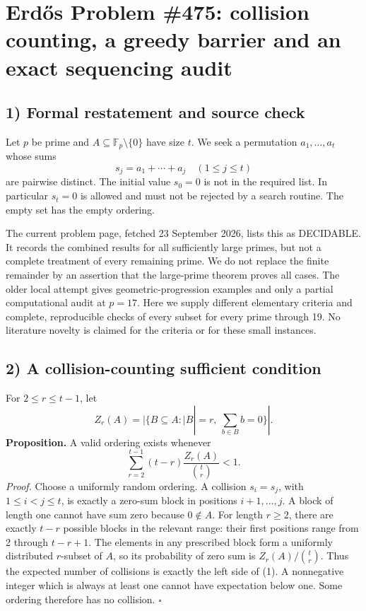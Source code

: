 \section{Erd\H{o}s Problem \#475: collision counting, a greedy barrier and an exact sequencing audit}

\subsection*{1) Formal restatement and source check}
Let $p$ be prime and $A\subseteq\mathbb F_p\setminus\{0\}$ have size $t$. We seek a permutation $a_1,\ldots,a_t$ whose sums
\[
 s_j=a_1+\cdots+a_j\quad(1\leq j\leq t)
\]
are pairwise distinct. The initial value $s_0=0$ is not in the required list. In particular $s_t=0$ is allowed and must not be rejected by a search routine. The empty set has the empty ordering.

The current problem page, fetched 23 September 2026, lists this as DECIDABLE. It records the combined results for all sufficiently large primes, but not a complete treatment of every remaining prime. We do not replace the finite remainder by an assertion that the large-prime theorem proves all cases. The older local attempt gives geometric-progression examples and only a partial computational audit at $p=17$. Here we supply different elementary criteria and complete, reproducible checks of every subset for every prime through 19. No literature novelty is claimed for the criteria or for these small instances.

\subsection*{2) A collision-counting sufficient condition}
For $2\leq r\leq t-1$, let
\[
 Z_r(A)=|\{B\subseteq A:|B|=r,\ \sum_{b\in B}b=0\}|.
\]
\textbf{Proposition.} A valid ordering exists whenever
\[
 \sum_{r=2}^{t-1}(t-r)\frac{Z_r(A)}{\binom tr}<1.
\tag{1}
\]
\emph{Proof.} Choose a uniformly random ordering. A collision $s_i=s_j$, with $1\leq i<j\leq t$, is exactly a zero-sum block in positions $i+1,\ldots,j$. A block of length one cannot have sum zero because $0\notin A$. For length $r\geq2$, there are exactly $t-r$ possible blocks in the relevant range: their first positions range from 2 through $t-r+1$. The elements in any prescribed block form a uniformly distributed $r$-subset of $A$, so its probability of zero sum is $Z_r(A)/\binom tr$. Thus the expected number of collisions is exactly the left side of (1). A nonnegative integer which is always at least one cannot have expectation below one. Some ordering therefore has no collision. $\square$

